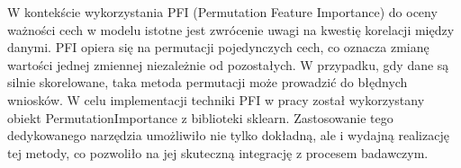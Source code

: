 \documentclass[a4paper,twoside,12pt]{book}
\begin{document}
W kontekście wykorzystania PFI (Permutation Feature Importance) do oceny ważności cech w modelu istotne jest zwrócenie uwagi na kwestię korelacji między danymi. PFI opiera się na permutacji pojedynczych cech, co oznacza zmianę wartości jednej zmiennej niezależnie od pozostałych. W przypadku, gdy dane są silnie skorelowane, taka metoda permutacji może prowadzić do błędnych wniosków. W celu implementacji techniki PFI w pracy został wykorzystany obiekt PermutationImportance z biblioteki sklearn. Zastosowanie tego dedykowanego narzędzia umożliwiło nie tylko dokładną, ale i wydajną realizację tej metody, co pozwoliło na jej skuteczną integrację z procesem badawczym.

\begin{table}[!h]
  \centering
  \caption{Porównanie  ważności wejść dla metody PFI}
\end{table}
\end{document}
